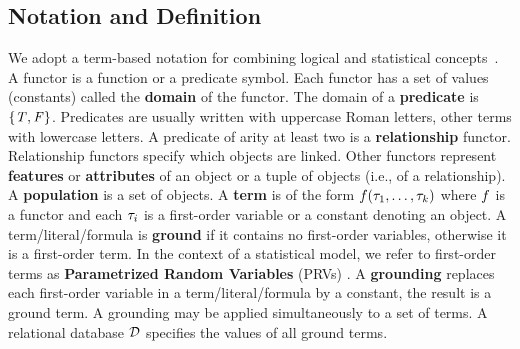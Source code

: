  	 
 	 
 	 \subsection{Notation and Definition}
 	 
 	 	
 	 	
 	 	
 	 	
 	 	
 	 	We adopt a term-based notation for combining logical and statistical concepts~\cite{Poole2003,Kimmig2014}.
 	 	A functor is a function or a predicate symbol. Each functor has a set of values (constants) called the \textbf{domain} of the functor. The domain of a \textbf{predicate} is $\{\mathit{T},\mathit{F}\}$. Predicates are usually written with uppercase Roman letters, other terms with lowercase letters.
 	 	A predicate of arity at least two is a \textbf{relationship} functor. Relationship functors specify which objects are linked. Other functors represent \textbf{features} or \textbf{attributes} of an object or a tuple of objects (i.e., of a relationship).
 	 	A \textbf{population} is a set of objects. 
 	 	A \textbf{term} is of the form $f(\tau_{1},\ldots,\tau_{k})$ where $f$ is a functor %
 	 	and each $\tau_{i}$ is a first-order variable or a constant denoting an object. A term/literal/formula is \textbf{ground} if it contains no first-order variables, otherwise it is a first-order term. In the context of a statistical model, we refer to first-order terms as \textbf{Parametrized Random Variables} (PRVs) \cite{Kimmig2014}. 
 	 	A \textbf{grounding} replaces each first-order variable in a term/literal/formula by a constant, the result is a ground term. A grounding may be applied simultaneously to a set of terms.  A relational database $\mathcal{D}$ specifies the values of all ground terms. %
 	 	
